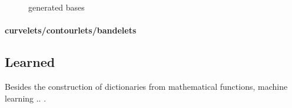 \begin{figure}
\centering
{}
\hspace{5mm}
\hspace{5mm}
\caption{generated bases}

\label{fig:16_1000_lasso}
\end{figure}


\paragraph{curvelets/contourlets/bandelets}


\subsection{Learned}


Besides the construction of dictionaries from mathematical functions, machine
learning .. .


